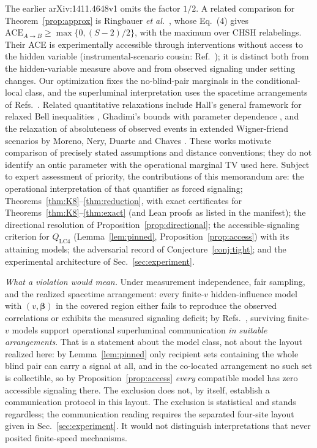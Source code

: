 \documentclass[10pt,twocolumn]{article}
\begin{document}
The earlier arXiv:1411.4648v1 omits the factor $1/2$.
A related comparison for Theorem~\ref{prop:approx} is Ringbauer
\emph{et al.}~\cite{Ringbauer2016}, whose Eq.~(4) gives
$\mathrm{ACE}_{A\to B}\ge\max\{0,(S-2)/2\}$, with the maximum over CHSH
relabelings. Their ACE is experimentally accessible through interventions
without access to the hidden variable (instrumental-scenario cousin:
Ref.~\cite{Gachechiladze2020}); it is distinct both from the hidden-variable
measure above and from observed signaling under setting changes. Our
optimization fixes the no-blind-pair marginals in the conditional-local class,
and the superluminal interpretation uses the spacetime arrangements of
Refs.~\cite{Bancal2012,Scarani2014}.
Related quantitative relaxations include Hall's general framework for relaxed
Bell inequalities \cite{Hall2011}, Ghadimi's bounds with parameter dependence
\cite{Ghadimi2021}, and the relaxation of absoluteness of observed events in
extended Wigner-friend scenarios by Moreno, Nery, Duarte and Chaves
\cite{Moreno2022}. These works motivate comparison of precisely stated
assumptions and distance conventions; they do not identify an ontic parameter
with the operational marginal TV used here. Subject to expert assessment of
priority, the contributions of this memorandum are: the operational
interpretation of that quantifier as forced signaling;
Theorems~\ref{thm:K8}--\ref{thm:reduction}, with exact certificates for
Theorems~\ref{thm:K8}--\ref{thm:exact} (and Lean proofs as listed in the
manifest); the directional resolution of Proposition~\ref{prop:directional};
the accessible-signaling criterion for $Q_{\mathrm{LC4}}$
(Lemma~\ref{lem:pinned}, Proposition~\ref{prop:access}) with its attaining
models; the adversarial record of Conjecture~\ref{conj:tight}; and the
experimental architecture of Sec.~\ref{sec:experiment}.

\emph{What a violation would mean.} Under measurement independence, fair sampling, and the realized spacetime arrangement: every finite-$v$ hidden-influence model with $(v,\boldsymbol\beta)$ in the covered region either fails to reproduce the observed correlations or exhibits the measured signaling deficit; by Refs.~\cite{Bancal2012,Scarani2014}, surviving finite-$v$ models support operational superluminal communication \emph{in suitable arrangements}. That is a statement about the model class, not about the layout realized here: by Lemma~\ref{lem:pinned} only recipient sets containing the whole blind pair can carry a signal at all, and in the co-located arrangement no such set is collectible, so by Proposition~\ref{prop:access} \emph{every} compatible model has zero accessible signaling there. The exclusion does not, by itself, establish a communication protocol in this layout. The exclusion is statistical and stands regardless; the communication reading requires the separated four-site layout given in Sec.~\ref{sec:experiment}. It would not distinguish interpretations that never posited finite-speed mechanisms.
\end{document}
